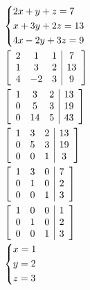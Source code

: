 \documentclass[../notes.tex]{subfiles}
\begin{document}
\begin{align}
&\begin{dcases}
	2x + y + z = 7 \\
	x + 3y + 2z = 13 \\
	4x - 2y + 3z = 9
\end{dcases} \\ 
&\left[ \begin{array}{ccc|c}
	2 & 1 & 1 & 7 \\
	1 & 3 & 2 & 13 \\
	4 & -2 & 3 & 9 
\end{array} \right] \\
&\left[ \begin{array}{ccc|c}
	1 & 3 & 2 & 13 \\
	0 & 5 & 3 & 19 \\
	0 & 14 & 5 & 43 
\end{array} \right] \\
&\left[ \begin{array}{ccc|c}
	1 & 3 & 2 & 13 \\
	0 & 5 & 3 & 19 \\
	0 & 0 & 1 & 3
\end{array} \right] \\
&\left[ \begin{array}{ccc|c}
	1 & 3 & 0 & 7 \\
	0 & 1 & 0 & 2 \\
	0 & 0 & 1 & 3
\end{array} \right] \\
&\left[ \begin{array}{ccc|c}
	1 & 0 & 0 & 1 \\
	0 & 1 & 0 & 2 \\
	0 & 0 & 1 & 3
\end{array} \right] \\
&\begin{dcases}
	x = 1 \\
	y = 2 \\
	z = 3 \\
\end{dcases}
\end{align} 
\end{document}
